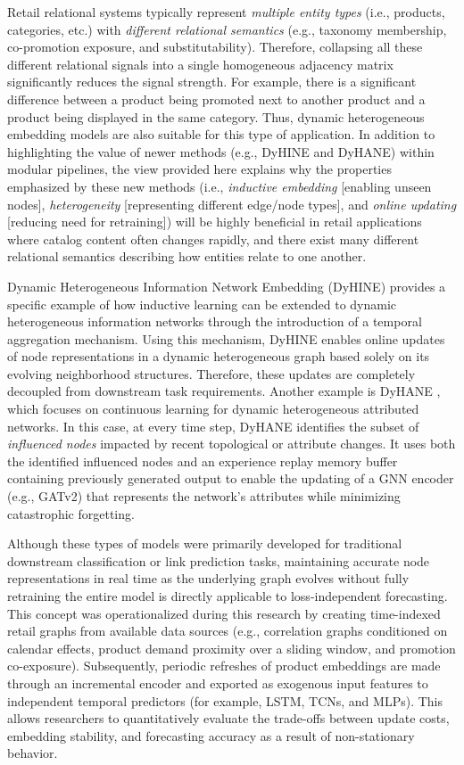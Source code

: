 Retail relational systems typically represent \textit{multiple entity types} (i.e., products, categories, etc.) with \textit{different relational semantics} (e.g., taxonomy membership, co-promotion exposure, and substitutability). Therefore, collapsing all these different relational signals into a single homogeneous adjacency matrix significantly reduces the signal strength. For example, there is a significant difference between a product being promoted next to another product and a product being displayed in the same category. Thus, dynamic heterogeneous embedding models are also suitable for this type of application. In addition to highlighting the value of newer methods (e.g., DyHINE and DyHANE) within modular pipelines, the view provided here explains why the properties emphasized by these new methods (i.e., \textit{inductive embedding} [enabling unseen nodes], \textit{heterogeneity} [representing different edge/node types], and \textit{online updating} [reducing need for retraining]) will be highly beneficial in retail applications where catalog content often changes rapidly, and there exist many different relational semantics describing how entities relate to one another.

Dynamic Heterogeneous Information Network Embedding (DyHINE) \cite{xie2021dyhine} provides a specific example of how inductive learning can be extended to dynamic heterogeneous information networks through the introduction of a temporal aggregation mechanism. Using this mechanism, DyHINE enables online updates of node representations in a dynamic heterogeneous graph based solely on its evolving neighborhood structures. Therefore, these updates are completely decoupled from downstream task requirements. Another example is DyHANE \cite{martirano2024dyhane}, which focuses on continuous learning for dynamic heterogeneous attributed networks. In this case, at every time step, DyHANE identifies the subset of \textit{influenced nodes} impacted by recent topological or attribute changes. It uses both the identified influenced nodes and an experience replay memory buffer containing previously generated output to enable the updating of a \ac{GNN} encoder (e.g., \ac{GATv2}) that represents the network's attributes while minimizing catastrophic forgetting.

Although these types of models were primarily developed for traditional downstream classification or link prediction tasks, maintaining accurate node representations in real time as the underlying graph evolves without fully retraining the entire model is directly applicable to loss-independent forecasting. This concept was operationalized during this research by creating time-indexed retail graphs from available data sources (e.g., correlation graphs conditioned on calendar effects, product demand proximity over a sliding window, and promotion co-exposure). Subsequently, periodic refreshes of product embeddings are made through an incremental encoder and exported as exogenous input features to independent temporal predictors (for example, \ac{LSTM}, \acp{TCN}, and \acp{MLP}). This allows researchers to quantitatively evaluate the trade-offs between update costs, embedding stability, and forecasting accuracy as a result of non-stationary behavior.





